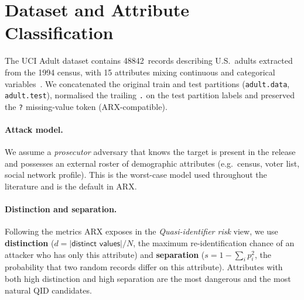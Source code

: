 \documentclass[a4paper,10pt]{article}
\begin{document}
\section{Dataset and Attribute Classification}
\label{sec:dataset}

The UCI Adult dataset contains \num{48842}~records describing U.S.\
adults extracted from the 1994 census, with 15 attributes mixing
continuous and categorical variables~\cite{ucibradult}. We
concatenated the original train and test partitions
(\texttt{adult.data}, \texttt{adult.test}), normalised the trailing
\texttt{.} on the test partition labels and preserved the
\texttt{?} missing-value token (ARX-compatible).

\paragraph{Attack model.} We assume a \emph{prosecutor} adversary that
knows the target is present in the release and possesses an external
roster of demographic attributes (e.g.\ census, voter list, social
network profile). This is the worst-case model used throughout the
literature and is the default in ARX.

\paragraph{Distinction and separation.} Following the metrics ARX
exposes in the \emph{Quasi-identifier risk} view, we use
\textbf{distinction} ($d=|\textsf{distinct values}|/N$, the maximum
re-identification chance of an attacker who has only this attribute)
and \textbf{separation} ($s=1-\sum_i p_i^2$, the probability that two
random records differ on this attribute). Attributes with both high
distinction and high separation are the most dangerous and the most
natural QID candidates.
\end{document}

